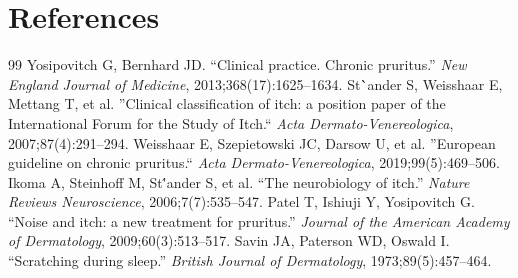 \section*{References}
\begin{thebibliography}{99}
 Yosipovitch G, Bernhard JD. ``Clinical practice. Chronic pruritus.'' \textit{New England Journal of Medicine}, 2013;368(17):1625--1634.
 St\``ander S, Weisshaar E, Mettang T, et al. ''Clinical classification of itch: a position paper of the International Forum for the Study of Itch.`` \textit{Acta Dermato-Venereologica}, 2007;87(4):291--294.
 Weisshaar E, Szepietowski JC, Darsow U, et al. ''European guideline on chronic pruritus.`` \textit{Acta Dermato-Venereologica}, 2019;99(5):469--506.
 Ikoma A, Steinhoff M, St\''ander S, et al. ``The neurobiology of itch.'' \textit{Nature Reviews Neuroscience}, 2006;7(7):535--547.
 Patel T, Ishiuji Y, Yosipovitch G. ``Noise and itch: a new treatment for pruritus.'' \textit{Journal of the American Academy of Dermatology}, 2009;60(3):513--517.
 Savin JA, Paterson WD, Oswald I. ``Scratching during sleep.'' \textit{British Journal of Dermatology}, 1973;89(5):457--464.

\end{thebibliography}

